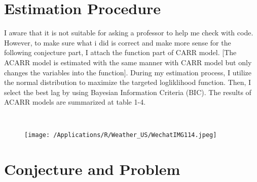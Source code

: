 \documentclass{article}
\begin{document}
	\section{Estimation Procedure}
	
	
	I aware that it is not suitable for asking a professor to help me check with code. However, to make sure what i did is correct and make more sense for the following conjecture part, I attach the function part of CARR model. [The ACARR model is estimated with the same manner with CARR model but only changes the variables into the function]. During my estimation process, I utilize the normal distribution to maximize the targeted logliklihood function. Then, I select the best lag by using Bayesian Information Criteria (BIC).  The results of ACARR models are summarized at table 1-4.
	
	~\\
	
	\begin{figure}[H]
		
		\texttt{[image: /Applications/R/Weather\_US/WechatIMG114.jpeg]}
		
	\end{figure}
	\pagebreak
	
	
	
	
	\pagebreak
	
	\section{Conjecture and Problem}
	
\end{document}
